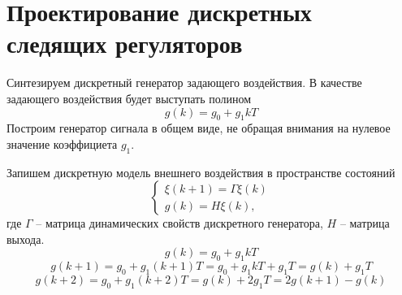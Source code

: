 \chapter{Проектирование дискретных следящих регуляторов}
\label{ch:chap2}
Синтезируем дискретный генератор задающего воздействия. В качестве задающего воздействия будет выступать полином
\begin{equation}
	g(k) = g_0 + g_1 kT 
\end{equation}
Построим генератор сигнала в общем виде, не обращая внимания на нулевое значение коэффициета $g_1$.

Запишем дискретную модель внешнего воздействия в пространстве состояний
\begin{equation}
	\begin{cases}
\xi \left(k+1\right) = \Gamma \xi (k)\\
g(k) = H \xi (k),
	\end{cases}
\end{equation}
где $\Gamma$ -- матрица динамических свойств дискретного генератора, $H$ -- матрица выхода.
\begin{equation}
		g(k) = g_0 + g_1 kT 
\end{equation}
\begin{equation}
	g(k+1) = g_0 + g_1 (k+1)T = g_0 + g_1 kT  + g_1T = g(k) +g_1T
\end{equation}
\begin{equation}
g(k+2) = g_0 + g_1 (k+2)T = g(k) + 2g_1T = 2 g(k+1) - g(k)
\end{equation}

